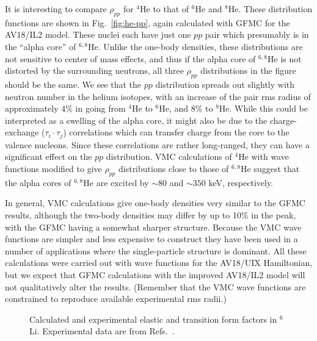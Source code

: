 It is interesting to compare $\rho_{pp}$ for $^4$He to that of $^6$He and 
$^8$He.
These distribution functions are shown in Fig.~\ref{fig:he-pp}, again
calculated with GFMC for the AV18/IL2 model.
These nuclei each have just one $pp$ pair which presumably is in the
``alpha core'' of $^{6,8}$He.
Unlike the one-body densities, these distributions are not sensitive to
center of mass effects, and thus if the alpha core of $^{6,8}$He is
not distorted by the surrounding neutrons, all three $\rho_{pp}$ distributions
in the figure should be the same.
We see that the $pp$ distribution spreads out slightly with neutron
number in the helium isotopes, with an increase of the pair rms radius of
approximately 4\% in going from $^4$He to  $^6$He, and 8\% to $^8$He.
While this could be interpreted as a swelling of the alpha core, it might
also be due to the charge-exchange ($\tau_i \cdot \tau_j$) correlations
which can transfer charge from the core to the valence nucleons.
Since these correlations are rather long-ranged, they can have
a significant effect on the $pp$ distribution.
VMC calculations of $^4$He with wave functions modified to give
$\rho_{pp}$ distributions close to those of $^{6,8}$He suggest
that the alpha cores of $^{6,8}$He are excited by $\sim80$ and $\sim350$ keV,
respectively.

In general, VMC calculations give one-body densities very similar to the
GFMC results, although the two-body densities may differ by up to 10\% in
the peak, with the GFMC having a somewhat sharper structure.
Because the VMC wave functions are simpler and less expensive to 
construct they have been used in a number of applications
where the single-particle structure is dominant.
All these calculations were carried out with wave functions for the AV18/UIX 
Hamiltonian, but we expect that GFMC calculations with the improved AV18/IL2 
model will not qualitatively alter the results.
(Remember that the VMC wave functions are constrained to reproduce available
experimental rms radii.)

\begin{figure}
\centerline{}
\caption{Calculated and experimental elastic and transition form factors in 
$^6$Li.  Experimental data are from 
Refs.~\protect\cite{Li71,Lap78,Ber82,Ran66,Deu79,Ber76,Ber75}.}
\label{fig:li6ff}
\end{figure}

